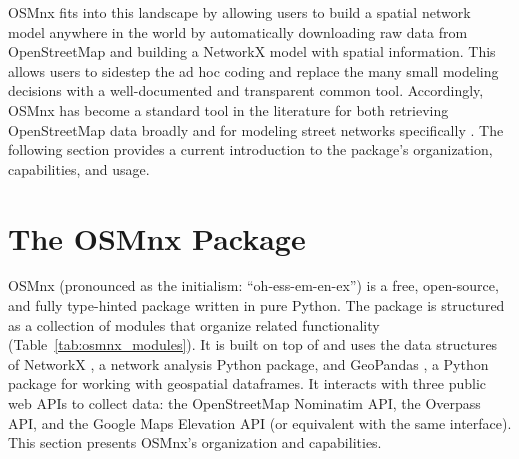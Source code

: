\documentclass[12pt,letterpaper]{article} %
\begin{document}
OSMnx fits into this landscape by allowing users to build a spatial network model anywhere in the world by automatically downloading raw data from OpenStreetMap and building a NetworkX model with spatial information. This allows users to sidestep the ad hoc coding and replace the many small modeling decisions with a well-documented and transparent common tool. Accordingly, OSMnx has become a standard tool in the literature for both retrieving OpenStreetMap data broadly and for modeling street networks specifically \citep{boeing_right_2020}. The following section provides a current introduction to the package's organization, capabilities, and usage.

\section{The OSMnx Package}

OSMnx (pronounced as the initialism: \enquote{oh-ess-em-en-ex}) is a free, open-source, and fully type-hinted package written in pure Python. The package is structured as a collection of modules that organize related functionality (Table~\ref{tab:osmnx_modules}). It is built on top of and uses the data structures of NetworkX \citep{hagberg_exploring_2008}, a network analysis Python package, and GeoPandas \citep{van_den_bossche_geopandasgeopandas_2024}, a Python package for working with geospatial dataframes. It interacts with three public web APIs to collect data: the OpenStreetMap Nominatim API, the Overpass API, and the Google Maps Elevation API (or equivalent with the same interface). This section presents OSMnx's organization and capabilities.
\end{document}
